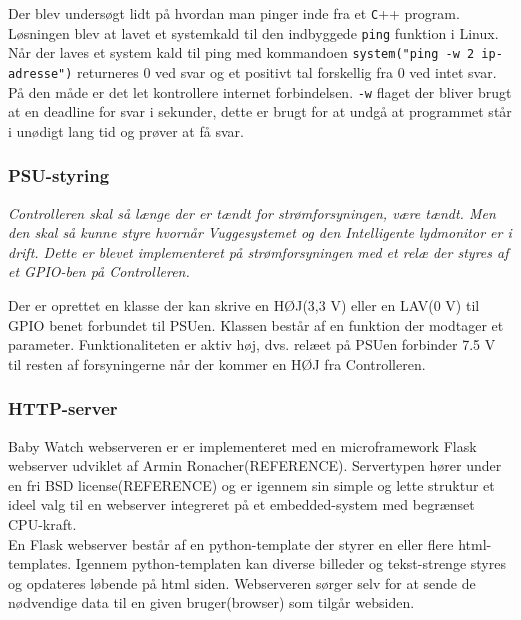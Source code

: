 Der blev undersøgt lidt på hvordan man pinger inde fra et \verb+C+++ program. Løsningen blev at lavet et systemkald til den indbyggede \verb+ping+ funktion i Linux. Når der laves et system kald til ping med kommandoen \verb+system("ping -w 2 ip-adresse")+ returneres 0 ved svar og et positivt tal forskellig fra 0 ved intet svar. På den måde er det let kontrollere internet forbindelsen. \verb+-w+ flaget der bliver brugt at en deadline for svar i sekunder, dette er brugt for at undgå at programmet står i unødigt lang tid og prøver at få svar.

\subsubsection*{PSU-styring}

\textit{Controlleren skal så længe der er tændt for strømforsyningen, være tændt. Men den skal så kunne styre hvornår Vuggesystemet og den Intelligente lydmonitor er i drift. Dette er blevet implementeret på strømforsyningen med et relæ der styres af et GPIO-ben på Controlleren.}

Der er oprettet en klasse der kan skrive en HØJ(3,3 V) eller en LAV(0 V) til GPIO benet forbundet til PSUen. Klassen består af en funktion der modtager et parameter. Funktionaliteten er aktiv høj, dvs. relæet på PSUen forbinder 7.5 V til resten af forsyningerne når der kommer en HØJ fra Controlleren.

\subsubsection*{HTTP-server}

Baby Watch webserveren er er implementeret med en microframework Flask  webserver udviklet af Armin Ronacher(REFERENCE). Servertypen hører under en fri BSD license(REFERENCE) og er igennem sin simple og lette struktur et ideel valg til en webserver integreret på et embedded-system med begrænset CPU-kraft. \\
En Flask webserver består af en python-template der styrer en eller flere html-templates. Igennem python-templaten kan diverse billeder og tekst-strenge styres og opdateres løbende på html siden. Webserveren sørger selv for at sende de nødvendige data til en given bruger(browser) som tilgår websiden. 

